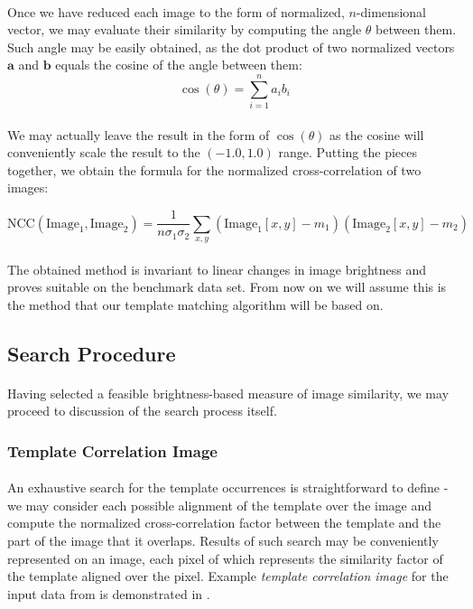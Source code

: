 \paragraph*{}
Once we have reduced each image to the form of normalized, $n$-dimensional vector, we may evaluate their similarity by computing the angle $\theta$ between them. Such angle may be easily obtained, as the dot product of two normalized vectors $\mathbf{a}$ and $\mathbf{b}$ equals the cosine of the angle between them:
\[
	\cos(\theta) = \sum_{i=1}^n a_i b_i
\] 

\paragraph*{}
We may actually leave the result in the form of $\cos(\theta)$ as the cosine will conveniently scale the result to the $(-1.0, 1.0)$ range. Putting the pieces together, we obtain the formula for the normalized cross-correlation of two images:

\[
\mbox{NCC}(\mbox{Image}_1,\mbox{Image}_2) = \frac{1}{n\sigma_1 \sigma_2} \sum_{x,y} (\mbox{Image}_1[x,y]-m_1)(\mbox{Image}_2[x,y]-m_2)
\]

\paragraph*{}
The obtained method is invariant to linear changes in image brightness and proves suitable on the benchmark data set. From now on we will assume this is the method that our template matching algorithm will be based on.

\subsection{Search Procedure}

\paragraph*{}
Having selected a feasible brightness-based measure of image similarity, we may proceed to discussion of the search process itself.

\subsubsection{Template Correlation Image}

\paragraph*{}
An exhaustive search for the template occurrences is straightforward to define - we may consider each possible alignment of the template over the image and compute the normalized cross-correlation factor between the template and the part of the image that it overlaps. Results of such search may be conveniently represented on an image, each pixel of which represents the similarity factor of the template aligned over the pixel. Example \textit{template correlation image} for the input data from  is demonstrated in .



